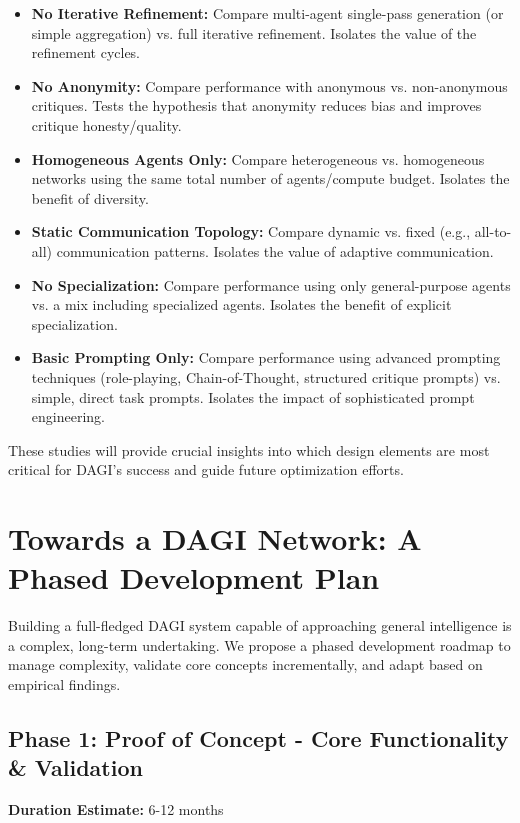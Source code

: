 \documentclass[12pt]{amsart}
\begin{document}
\begin{itemize}[leftmargin=*]
    \item \textbf{No Iterative Refinement:} Compare multi-agent single-pass generation (or simple aggregation) vs. full iterative refinement. Isolates the value of the refinement cycles.
    \item \textbf{No Anonymity:} Compare performance with anonymous vs. non-anonymous critiques. Tests the hypothesis that anonymity reduces bias and improves critique honesty/quality.
    \item \textbf{Homogeneous Agents Only:} Compare heterogeneous vs. homogeneous networks using the same total number of agents/compute budget. Isolates the benefit of diversity.
    \item \textbf{Static Communication Topology:} Compare dynamic vs. fixed (e.g., all-to-all) communication patterns. Isolates the value of adaptive communication.
    \item \textbf{No Specialization:} Compare performance using only general-purpose agents vs. a mix including specialized agents. Isolates the benefit of explicit specialization.
    \item \textbf{Basic Prompting Only:} Compare performance using advanced prompting techniques (role-playing, Chain-of-Thought, structured critique prompts) vs. simple, direct task prompts. Isolates the impact of sophisticated prompt engineering.
\end{itemize}
These studies will provide crucial insights into which design elements are most critical for DAGI's success and guide future optimization efforts.

\section{Towards a DAGI Network: A Phased Development Plan}
\label{sec:development_plan}
Building a full-fledged DAGI system capable of approaching general intelligence is a complex, long-term undertaking. We propose a phased development roadmap to manage complexity, validate core concepts incrementally, and adapt based on empirical findings.

\subsection{Phase 1: Proof of Concept - Core Functionality \& Validation}
\label{subsec:phase1}
\textbf{Duration Estimate:} 6-12 months
\end{document}
